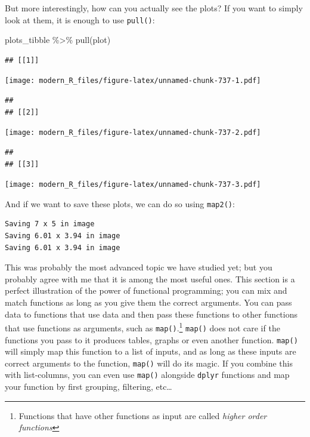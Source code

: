\documentclass[
]{article}
\newenvironment{Shaded}{\begin{snugshade}}{\end{snugshade}}
\newcommand{\FunctionTok}[1]{\textcolor[rgb]{0.00,0.00,0.00}{#1}}
\newcommand{\NormalTok}[1]{#1}
\newcommand{\SpecialCharTok}[1]{\textcolor[rgb]{0.00,0.00,0.00}{#1}}
\newcommand{\StringTok}[1]{\textcolor[rgb]{0.31,0.60,0.02}{#1}}
\begin{document}
But more interestingly, how can you actually see the plots? If you want to simply look at them, it
is enough to use \texttt{pull()}:

\begin{Shaded}
\begin{Highlighting}[]
\NormalTok{plots\_tibble }\SpecialCharTok{\%\textgreater{}\%}
  \FunctionTok{pull}\NormalTok{(plot)}
\end{Highlighting}
\end{Shaded}

\begin{verbatim}
## [[1]]
\end{verbatim}

\texttt{[image: modern\_R\_files/figure-latex/unnamed-chunk-737-1.pdf]}

\begin{verbatim}
## 
## [[2]]
\end{verbatim}

\texttt{[image: modern\_R\_files/figure-latex/unnamed-chunk-737-2.pdf]}

\begin{verbatim}
## 
## [[3]]
\end{verbatim}

\texttt{[image: modern\_R\_files/figure-latex/unnamed-chunk-737-3.pdf]}

And if we want to save these plots, we can do so using \texttt{map2()}:

\begin{Shaded}
\end{Shaded}

\begin{verbatim}
Saving 7 x 5 in image
Saving 6.01 x 3.94 in image
Saving 6.01 x 3.94 in image
\end{verbatim}

This was probably the most advanced topic we have studied yet; but you probably agree with me that
it is among the most useful ones. This section is a perfect illustration of the power of functional
programming; you can mix and match functions as long as you give them the correct arguments.
You can pass data to functions that use data and then pass these functions to other functions that
use functions as arguments, such as \texttt{map()}.\footnote{Functions that have other functions as input are
  called \emph{higher order functions}} \texttt{map()} does not care if the functions you pass to it produces tables,
graphs or even another function. \texttt{map()} will simply map this function to a list of inputs, and as
long as these inputs are correct arguments to the function, \texttt{map()} will do its magic. If you
combine this with list-columns, you can even use \texttt{map()} alongside \texttt{dplyr} functions and map your
function by first grouping, filtering, etc\ldots{}
\end{document}
